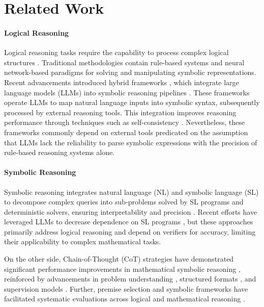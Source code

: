 \section{Related Work}
\paragraph{Logical Reasoning} Logical reasoning tasks require the capability to process complex logical structures \cite{cummins1991conditional}. Traditional methodologies contain rule-based systems \cite{robinson1965machine} and neural network-based paradigms \cite{amayuelas2022neural,gerasimova2023comparative} for solving and manipulating symbolic representations. Recent advancements introduced hybrid frameworks \cite{pan2023logic,ye2024satlm,jiang2024leanreasoner}, which integrate large language models (LLMs) into symbolic reasoning pipelines \cite{quan2024verificationrefinementnaturallanguage}. These frameworks operate LLMs to map natural language inputs into symbolic syntax, subsequently processed by external reasoning tools. This integration improves reasoning performance through techniques such as self-consistency \cite{wang2023plan,zhang2022automatic}. Nevertheless, these frameworks commonly depend on external tools predicated on the assumption that LLMs lack the reliability to parse symbolic expressions with the precision of rule-based reasoning systems alone.

\paragraph{Symbolic Reasoning}
Symbolic reasoning integrates natural language (NL) and symbolic language (SL) to decompose complex queries into sub-problems solved by SL programs and deterministic solvers, ensuring interpretability and precision \cite{lyu2023faithful}. Recent efforts have leveraged LLMs to decrease dependence on SL programs \cite{xu2024faithful}, but these approaches primarily address logical reasoning and depend on verifiers for accuracy, limiting their applicability to complex mathematical tasks.

On the other side, Chain-of-Thought (CoT) strategies have demonstrated significant performance improvements in mathematical symbolic reasoning \cite{jiang2024llms}, reinforced by advancements in problem understanding \cite{zhong2024achieving}, structured formats \cite{tam2024let}, and supervision models \cite{ranaldi2024aligning,ranaldi-freitas-2024-self,jiang2024rationalystpretrainingprocesssupervisionimproving}. Further, premise selection and symbolic frameworks have facilitated systematic evaluations across logical and mathematical reasoning \cite{meadows2023symbolic,ferreira2020premise}.